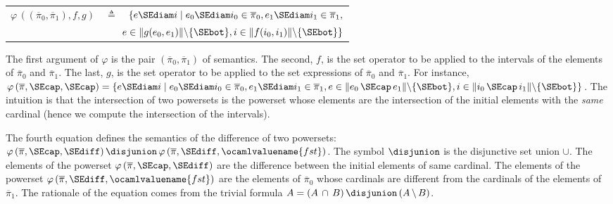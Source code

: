 \begin{itemize}
\vspace*{-4mm}

\begin{center}
\begin{tabular}{rcl}
    $\varphi \, ((\overline{\pi}_0, \overline{\pi}_1), f, g)$
  & \hspace*{-4mm} $\triangleq$
  & \hspace*{-4mm}
    $\{e \SEdiam i \mid e_0 \SEdiam i_0 \in \overline{\pi}_0, 
       e_1 \SEdiam i_1 \in \overline{\pi}_1,$\\
    \multicolumn{3}{r}{
      $e \in \|g (e_0, e_1)\| \backslash \{\SEbot\}, i \in \|f (i_0,
       i_1)\| \backslash \{\SEbot\}\}$ 
    }
\end{tabular}
\end{center}

\noindent
The first argument of $\varphi$ is the pair $(\overline{\pi}_0,
\overline{\pi}_1)$ of semantics. The second, $f$, is the set operator
to be applied to the intervals of the elements of $\overline{\pi}_0$
and $\overline{\pi}_1$. The last, $g$, is the set operator to be
applied to the set expressions of $\overline{\pi}_0$ and
$\overline{\pi}_1$. For instance, $\varphi \, (\overline{\pi}, \SEcap,
\SEcap) = \{e \SEdiam i \mid e_0 \SEdiam i_0 \in \overline{\pi}_0, e_1
\SEdiam i_1 \in \overline{\pi}_1, e \in \|e_0 \, \SEcap \, e_1\|
\backslash \{\SEbot\}, i \in \|i_0 \, \SEcap \, i_1\| \backslash
\{\SEbot\}\}$. The intuition is that the intersection of two powersets
is the powerset whose elements are the intersection of the initial
elements with the \emph{same} cardinal (hence we compute the
intersection of the intervals).

The fourth equation defines the semantics of the difference of two
powersets: $\varphi \, (\overline{\pi}, \SEcap, \SEdiff) \, \disjunion
\, \varphi \, (\overline{\pi}, \SEdiff, \ocamlvaluename{fst})$. The
symbol $\disjunion$ is the disjunctive set union $\cup$. The elements
of the powerset $\varphi \, (\overline{\pi}, \SEcap, \SEdiff)$ are the
difference between the initial elements of same cardinal. The elements
of the powerset $\varphi \, (\overline{\pi}, \SEdiff,
\ocamlvaluename{fst})$ are the elements of $\overline{\pi}_0$ whose
cardinals are different from the cardinals of the elements of
$\overline{\pi}_1$. The rationale of the equation comes from the
trivial formula $A = (A \, \cap \, B) \, \disjunion \, (A \,
\backslash \, B)$.


\end{itemize}
